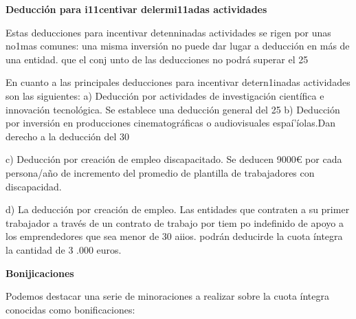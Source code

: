 \documentclass[10pt,a4paper]{article}
\begin{document}
\textbf{Deducción para i11centivar delermi11adas actividades}

Estas deducciones para incentivar detenninadas actividades se rigen por unas no1mas comunes: una misma inversión no puede dar lugar a deducción en más de una entidad. que el conj unto de las deducciones no podrá superar el 25%

En cuanto a las principales deducciones para incentivar detern1inadas actividades son las siguientes:
a) Deducción por actividades de investigación científica e innovación tecnológica.
Se establece una deducción general del 25%
b) Deducción por inversión en producciones cinematográficas o audiovisuales espaí'íolas.Dan derecho a la deducción del 30%

c) Deducción por creación de empleo discapacitado. Se deducen 9000€ por cada persona/año de incremento del promedio de plantilla de trabajadores con discapacidad.

d) La deducción por creación de empleo. Las entidades que contraten a su primer trabajador a través de un contrato de trabajo por tiem po indefinido de apoyo a los emprendedores que sea menor de 30 aiios. podrán deducirde la cuota íntegra la cantidad de 3 .000 euros.

\textbf{Bonijicaciones}

Podemos destacar una serie de minoraciones a realizar sobre la cuota íntegra conocidas como bonificaciones:
\end{document}
